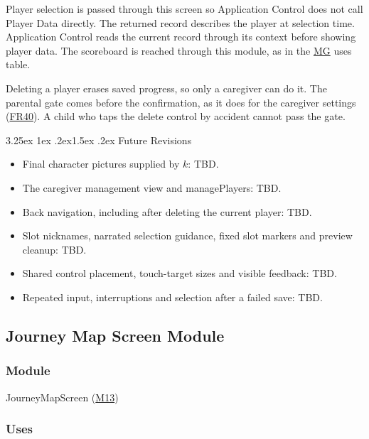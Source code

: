\documentclass[10pt, titlepage]{article}
\makeatletter
\newcommand{\srsurl}{https://team-hindsight.github.io/ophthamology-game/SRS/SRS.pdf}
\newcommand{\srsitemref}[2]{\href{\srsurl\#nameddest=#1}{#2}}
\newcommand{\mgurl}{https://github.com/team-hindsight/ophthamology-game/blob/main/pdfs/Design/SoftArchitecture/MG.pdf}
\newcommand{\mg}{\href{\mgurl}{MG}}
\newcommand{\misref}[2]{\hyperref[mis:#1]{M#2}}
\renewcommand\paragraph{\@startsection{paragraph}{4}{\z@}%
  {3.25ex \@plus 1ex \@minus .2ex}{1.5ex \@plus .2ex}%
  {\normalfont\normalsize\bfseries}}
\makeatother
\begin{document}
Player selection is passed through this screen so Application Control
does not call Player Data directly. The returned record describes the
player at selection time. Application Control reads the current record
through its context before showing player data. The scoreboard is reached through this
module, as in the \mg{} uses table.

Deleting a player erases saved progress, so only a caregiver can do it.
The parental gate comes before the confirmation, as it does for the
caregiver settings (\srsitemref{FR_ParentGate}{FR40}). A child who taps the
delete control by accident cannot pass the gate.

\paragraph{Future Revisions}

\begin{itemize}
\item Final character pictures supplied by $k$: TBD.
\item The caregiver management view and managePlayers: TBD.
\item Back navigation, including after deleting the current player: TBD.
\item Slot nicknames, narrated selection guidance, fixed slot markers
  and preview cleanup: TBD.
\item Shared control placement, touch-target sizes and visible feedback: TBD.
\item Repeated input, interruptions and selection after a failed save: TBD.
\end{itemize}

\newpage
\subsection{Journey Map Screen Module} \label{mis:Map}

\subsubsection{Module}

JourneyMapScreen (\misref{Map}{13})

\subsubsection{Uses}
\end{document}
